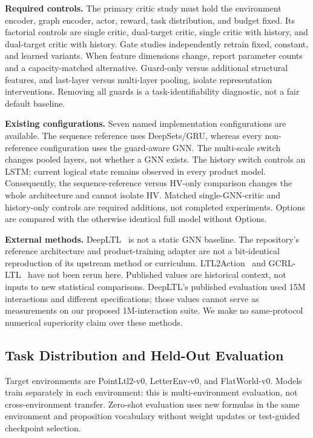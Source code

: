 \documentclass[conference]{IEEEtran}
\begin{document}
\textbf{Required controls.}
The primary critic study must hold the environment encoder, graph encoder, actor, reward, task distribution, and budget fixed. Its factorial controls are single critic, dual-target critic, single critic with history, and dual-target critic with history. Gate studies independently retrain fixed, constant, and learned variants. When feature dimensions change, report parameter counts and a capacity-matched alternative. Guard-only versus additional structural features, and last-layer versus multi-layer pooling, isolate representation interventions. Removing all guards is a task-identifiability diagnostic, not a fair default baseline.

\textbf{Existing configurations.}
Seven named implementation configurations are available. The sequence reference uses DeepSets/GRU, whereas every non-reference configuration uses the guard-aware GNN. The multi-scale switch changes pooled layers, not whether a GNN exists. The history switch controls an LSTM; current logical state remains observed in every product model. Consequently, the sequence-reference versus HV-only comparison changes the whole architecture and cannot isolate HV. Matched single-GNN-critic and history-only controls are required additions, not completed experiments. Options are compared with the otherwise identical full model without Options.

\textbf{External methods.}
DeepLTL~\citep{deepltl} is not a static GNN baseline. The repository's reference architecture and product-training adapter are not a bit-identical reproduction of its upstream method or curriculum. LTL2Action~\citep{Vaezipoor2021} and GCRL-LTL~\citep{Qiu2023} have not been rerun here. Published values are historical context, not inputs to new statistical comparisons. DeepLTL's published evaluation used 15M interactions and different specifications; those values cannot serve as measurements on our proposed 1M-interaction suite. We make no same-protocol numerical superiority claim over these methods.

\subsection{Task Distribution and Held-Out Evaluation}
\label{sec:splits}
Target environments are PointLtl2-v0, LetterEnv-v0, and FlatWorld-v0. Models train separately in each environment: this is multi-environment evaluation, not cross-environment transfer. Zero-shot evaluation uses new formulas in the same environment and proposition vocabulary without weight updates or test-guided checkpoint selection.
\end{document}
